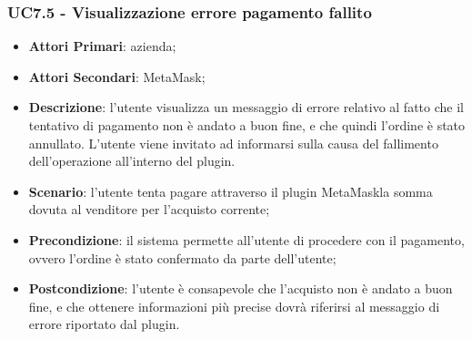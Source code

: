 \subsubsection{UC7.5 - Visualizzazione errore pagamento fallito}
\begin{itemize}
	\item \textbf{Attori Primari}: azienda;
	\item \textbf{Attori Secondari}: MetaMask\glo;
	\item \textbf{Descrizione}:
	l'utente visualizza un messaggio di errore relativo al fatto che il tentativo di pagamento non è andato a buon fine, e che quindi l'ordine è stato annullato. L'utente viene invitato ad informarsi sulla causa del fallimento dell'operazione all'interno del plugin.
	\item \textbf{Scenario}: l'utente tenta pagare attraverso il plugin MetaMask\glosp la somma dovuta al venditore per l'acquisto corrente;
	\item \textbf{Precondizione}: il sistema permette all'utente di procedere con il pagamento, ovvero l'ordine è stato confermato da parte dell'utente;
	\item \textbf{Postcondizione}:
	l'utente è consapevole che l'acquisto non è andato a buon fine, e che ottenere informazioni più precise dovrà riferirsi al messaggio di errore riportato dal plugin. 
\end{itemize}